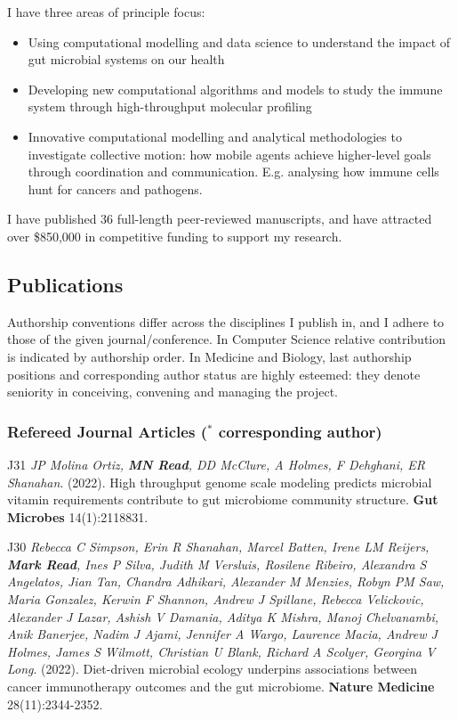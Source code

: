 \documentclass[a4paper]{article}
\begin{document}
I have three areas of principle focus:
\begin{itemize}
\item Using computational modelling and data science to understand the impact of gut microbial systems on our health
\item Developing new computational algorithms and models to study the immune system through high-throughput molecular profiling
\item Innovative computational modelling and analytical methodologies to investigate collective motion: how mobile agents achieve higher-level goals through coordination and communication. E.g. analysing how immune cells hunt for cancers and pathogens.
\end{itemize}

I have published 36 full-length peer-reviewed manuscripts, and have attracted over \$850,000 in competitive funding to support my research.

\subsection*{Publications}

Authorship conventions differ across the disciplines I publish in, and I adhere to those of the given journal/conference.
In Computer Science relative contribution is indicated by authorship order.
In Medicine and Biology, last authorship positions and corresponding author status are highly esteemed: they denote seniority in conceiving, convening and managing the project.

\subsubsection*{Refereed Journal Articles ($^{*}$ corresponding author)}


\item[J31]
\textit{JP Molina Ortiz, \textbf{MN Read}, DD McClure, A Holmes, F Dehghani, ER Shanahan}.
(2022).
High throughput genome scale modeling predicts microbial vitamin requirements contribute to gut microbiome community structure.
\textbf{Gut Microbes} 14(1):2118831.

\item[J30]
\textit{Rebecca C Simpson, Erin R Shanahan, Marcel Batten, Irene LM Reijers, \textbf{Mark Read}, Ines P Silva, Judith M Versluis, Rosilene Ribeiro, Alexandra S Angelatos, Jian Tan, Chandra Adhikari, Alexander M Menzies, Robyn PM Saw, Maria Gonzalez, Kerwin F Shannon, Andrew J Spillane, Rebecca Velickovic, Alexander J Lazar, Ashish V Damania, Aditya K Mishra, Manoj Chelvanambi, Anik Banerjee, Nadim J Ajami, Jennifer A Wargo, Laurence Macia, Andrew J Holmes, James S Wilmott, Christian U Blank, Richard A Scolyer, Georgina V Long}.
(2022).
Diet-driven microbial ecology underpins associations between cancer immunotherapy outcomes and the gut microbiome.
\textbf{Nature Medicine} 28(11):2344-2352.
\end{document}
